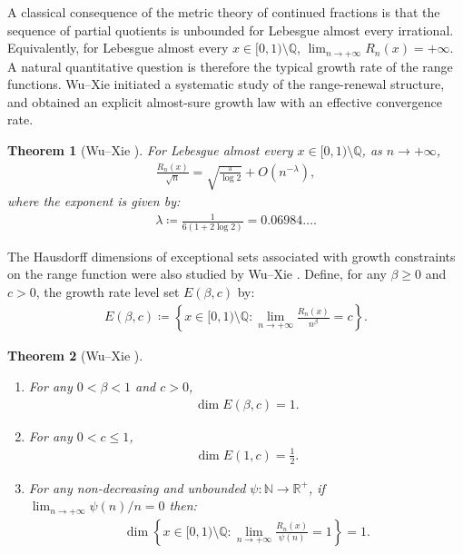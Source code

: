 \documentclass[12pt,reqno]{amsart}
\theoremstyle{definition}
\theoremstyle{plain}
\newtheorem*{thm*}{Theorem}
\begin{document}
A classical consequence of the metric theory of continued fractions is that the sequence of partial quotients is unbounded for Lebesgue almost every irrational. Equivalently, for Lebesgue almost every $x\in[0,1)\setminus\mathbb{Q}$, $\lim_{n\to+\infty}R_n(x)=+\infty$. A natural quantitative question is therefore the typical growth rate of the range functions. Wu--Xie \cite{WuXie2017RangeRenewalCF} initiated a systematic study of the range-renewal structure, and obtained an explicit almost-sure growth law with an effective convergence rate.
\begin{thm*}[Wu--Xie {\cite[Remark~2]{WuXie2017RangeRenewalCF}}]
    For Lebesgue almost every $x\in[0,1)\setminus\mathbb{Q}$, as $n\to+\infty$,
    \begin{align}
    \label{eq: Wu--Xie (2.9)}
        \frac{R_n(x)}{\sqrt{n}}
        =\sqrt{\frac{\pi}{\log 2}}+O\!\left(n^{-\lambda}\right),
    \end{align}
    where the exponent is given by:
    \begin{align*}
        \lambda\coloneqq\frac{1}{6(1+2\log{2})}=0.06984\ldots.
    \end{align*}
\end{thm*}

The Hausdorff dimensions of exceptional sets associated with growth constraints on the range function were also studied by Wu--Xie \cite{WuXie2017RangeRenewalCF}. Define, for any $\beta\geq 0$ and $c>0$, the growth rate level set $E(\beta,c)$ by:
\begin{align*}
    E(\beta,c)
    \coloneqq \left\{x\in[0,1)\setminus\mathbb{Q}: \lim_{n\to+\infty}\frac{R_n(x)}{n^\beta}=c\right\}.
\end{align*}

\begin{thm*}[Wu--Xie {\cite[Theorem~2 \& Remark~3]{WuXie2017RangeRenewalCF}}]\label{thm:WX-dim}
\leavevmode
\begin{enumerate}
    \item
    For any $0<\beta<1$ and $c>0$,
    \begin{align*}
        \dim E(\beta,c)=1.
    \end{align*}
    \item
    For any $0<c\leq 1$,
    \begin{align*}
        \dim E(1,c)=\frac12.
    \end{align*}
    \item
    For any non-decreasing and unbounded $\psi:\mathbb{N}\to\mathbb{R}^+$, if $\lim_{n\to+\infty}\psi(n)/n=0$ then:
    \begin{align*}
        \dim{\left\{x\in[0,1)\setminus\mathbb{Q}: 
        \lim_{n\to+\infty}\frac{R_n(x)}{\psi(n)}=1\right\}}=1.
    \end{align*}
    \end{enumerate}
\end{thm*}
\end{document}
